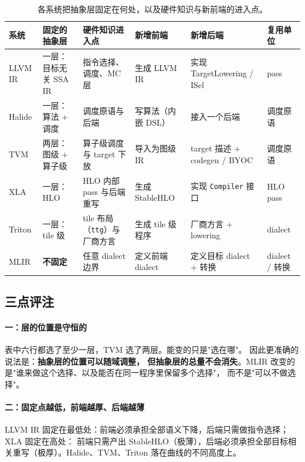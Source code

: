 \begin{table}[t]
  \caption{各系统把抽象层固定在何处，以及硬件知识与新前端的进入点。}
  \label{tab:layer-fixing}
  \small
  \begin{tabularx}{\linewidth}{@{}l
      >{\raggedright\arraybackslash}p{1.5cm}
      >{\raggedright\arraybackslash}p{1.9cm}
      >{\raggedright\arraybackslash}p{1.7cm}
      >{\raggedright\arraybackslash}p{1.9cm}
      >{\raggedright\arraybackslash}p{1.3cm}@{}}
    \toprule
    系统 & 固定的抽象层 & 硬件知识进入点 & 新增前端 & 新增后端 & 复用单位 \\
    \midrule
    LLVM IR & 一层：目标无关 SSA IR & 指令选择、调度、MC 层
      & 生成 LLVM IR & 实现 TargetLowering / ISel & pass \\
    Halide & 一层：算法 + 调度 & 调度原语与后端
      & 写算法（内嵌 DSL） & 接入一个后端 & 调度原语 \\
    TVM & 两层：图级 + 算子级 & 算子级调度与 target 下放
      & 导入为图级 IR & target 描述 + codegen / BYOC & 调度原语 \\
    XLA & 一层：HLO & HLO 内部 pass 与后端重写
      & 生成 StableHLO & 实现 \texttt{Compiler} 接口 & HLO pass \\
    Triton & 一层：tile 级 & tile 布局（\texttt{ttg}）与厂商方言
      & 生成 tile 级程序 & 厂商方言 + lowering & dialect \\
    MLIR & \textbf{不固定} & 任意 dialect 边界
      & 定义前端 dialect & 定义目标 dialect + 转换 & dialect / 转换 \\
    \bottomrule
  \end{tabularx}
\end{table}

\subsection{三点评注}

\paragraph{一：层的位置是守恒的}
表中六行都选了至少一层，TVM 选了两层。能变的只是"选在哪"。
因此更准确的说法是：\textbf{抽象层的位置可以随域调整，
但抽象层的总量不会消失}。MLIR 改变的是"谁来做这个选择、以及能否在同一程序里保留多个选择"，
而不是"可以不做选择"。

\paragraph{二：固定点越低，前端越厚、后端越薄}
LLVM IR 固定在最低处：前端必须承担全部语义下降，后端只需做指令选择；XLA 固定在高处：
前端只需产出 StableHLO（极薄），后端必须承担全部目标相关重写（极厚）。Halide、TVM、Triton
落在曲线的不同高度上。

